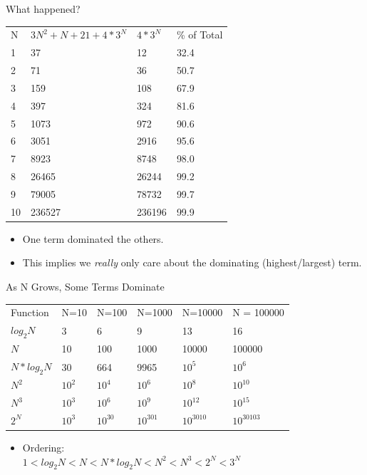 \documentclass{beamer}
\begin{document}
\begin{frame}{What happened?}

\begin{tabular}{l l l l}
N  & $3N^2 + N + 21 + 4*3^N$  & $4*3^N$ & \% of Total \\
1  &         37  &        12  &      32.4 \\
2  &         71  &        36  &      50.7 \\
3  &        159  &       108  &      67.9 \\
4  &        397  &       324  &      81.6 \\
5  &       1073  &       972  &      90.6 \\
6  &       3051  &      2916  &      95.6 \\
7  &       8923  &      8748  &      98.0 \\
8  &      26465  &     26244  &      99.2 \\
9  &      79005  &     78732  &      99.7 \\
10 &     236527  &    236196  &      99.9 \\
\end{tabular}

\begin{itemize}
\item One term dominated the others.
\item This implies we \textit{really} only care about the dominating (highest/largest) term.
\end{itemize}
\end{frame}

\begin{frame}{As N Grows, Some Terms Dominate}
\begin{tabular}{l l l l l l}
Function   & N=10   & N=100  & N=1000 & N=10000 & N = 100000 \\
$log_2N$   & 3      & 6      & 9      & 13      & 16 \\
$N$        & 10     & 100    & 1000   & 10000   & 100000 \\
$N*log_2N$ & 30     & 664    & 9965   & $10^5$  & $10^6$ \\
$N^2$      & $10^2$ & $10^4$ & $10^6$ & $10^8$  & $10^{10}$ \\
$N^3$      & $10^3$ & $10^6$ & $10^9$ & $10^{12}$  & $10^{15}$ \\
$2^N$      & $10^3$ & $10^{30}$ & $10^{301}$ & $10^{3010}$  & $10^{30103}$ \\
\end{tabular}
\begin{itemize}
\item Ordering:\\
$1 < log_2N < N < N*log_2N < N^2 < N^3 < 2^N < 3^N$
\end{itemize}
\end{frame}
\end{document}
